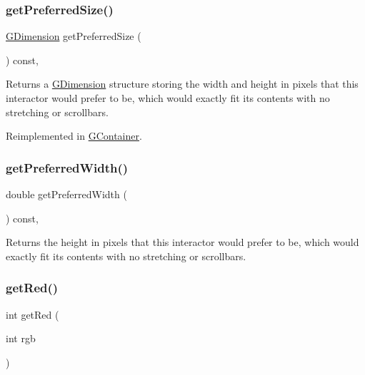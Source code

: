 \subsubsection{\texorpdfstring{get\+Preferred\+Size()}{getPreferredSize()}}
{\footnotesize\ttfamily \mbox{\hyperlink{structsgl_1_1GDimension}{G\+Dimension}} get\+Preferred\+Size (\begin{DoxyParamCaption}{ }\end{DoxyParamCaption}) const\hspace{0.3cm}{\ttfamily [virtual]}, {\ttfamily [inherited]}}



Returns a \mbox{\hyperlink{structsgl_1_1GDimension}{G\+Dimension}} structure storing the width and height in pixels that this interactor would prefer to be, which would exactly fit its contents with no stretching or scrollbars. 



Reimplemented in \mbox{\hyperlink{classsgl_1_1GContainer_ac0fd6fc35681f935c67ad68078b354b8}{G\+Container}}.

\mbox{\label{classsgl_1_1GInteractor_a82bca31d37700fb0e35d2743352efd5e}} 
\subsubsection{\texorpdfstring{get\+Preferred\+Width()}{getPreferredWidth()}}
{\footnotesize\ttfamily double get\+Preferred\+Width (\begin{DoxyParamCaption}{ }\end{DoxyParamCaption}) const\hspace{0.3cm}{\ttfamily [virtual]}, {\ttfamily [inherited]}}



Returns the height in pixels that this interactor would prefer to be, which would exactly fit its contents with no stretching or scrollbars. 

\mbox{\label{classsgl_1_1GCanvas_adef2eb72dada1f3c3ef5079705cd278a}} 
\subsubsection{\texorpdfstring{get\+Red()}{getRed()}}
{\footnotesize\ttfamily int get\+Red (\begin{DoxyParamCaption}\item[{int}]{rgb }\end{DoxyParamCaption})\hspace{0.3cm}{\ttfamily [static]}}



